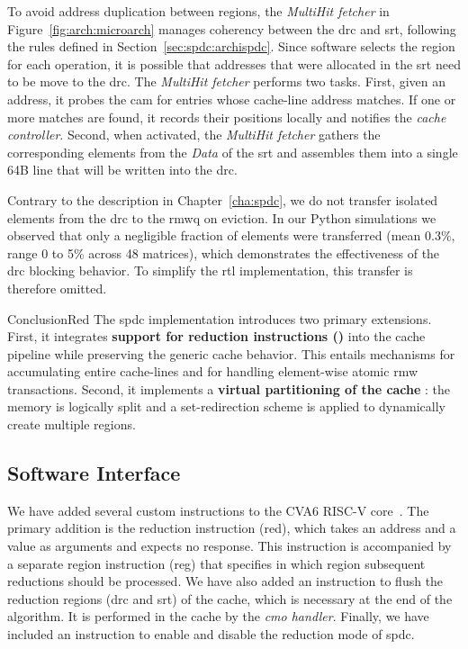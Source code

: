 To avoid address duplication between regions, the \textit{MultiHit fetcher} in Figure~\ref{fig:arch:microarch} manages coherency between the \acrshort{drc} and \acrshort{srt}, following the rules defined in Section~\ref{sec:spdc:archispdc}.
Since software selects the region for each operation, it is possible that addresses that were allocated in the \acrshort{srt} need to be move to the \acrshort{drc}.
The \textit{MultiHit fetcher} performs two tasks.
First, given an address, it probes the \acrshort{cam} for entries whose cache-line address matches.
If one or more matches are found, it records their positions locally and notifies the \textit{cache controller}.
Second, when activated, the \textit{MultiHit fetcher} gathers the corresponding elements from the \textit{Data}  of the \acrshort{srt} and assembles them into a single 64B line that will be written into the \acrshort{drc}.

Contrary to the description in Chapter~\ref{cha:spdc}, we do not transfer isolated elements from the \acrshort{drc} to the \acrshort{rmwq} on \gls{eviction}.
In our Python simulations we observed that only a negligible fraction of elements were transferred (mean 0.3\%, range 0 to 5\% across 48 matrices), which demonstrates the effectiveness of the \acrshort{drc} blocking behavior.
To simplify the \acrshort{rtl} implementation, this transfer is therefore omitted.

\begin{highlight}{Conclusion}{Red}
    The \acrlong{spdc} implementation introduces two primary extensions.
    First, it integrates \textbf{support for \gls{reduction} instructions ()} into the cache \gls{pipeline} while preserving the generic cache behavior.
    This entails mechanisms for accumulating entire cache-lines and for handling element-wise atomic \acrshort{rmw} transactions.
    Second, it implements a \textbf{virtual partitioning of the cache }: the memory is logically split and a \gls{set}-redirection scheme is applied to dynamically create multiple regions.
\end{highlight}

\subsection{Software Interface}
\label{sec:arch:sw_interface}

We have added several custom instructions to the CVA6 RISC-V core~\cite{Waterman2016_RISCV_ISA}.
The primary addition is the \gls{reduction} instruction (\acrshort{red}), which takes an address and a value as arguments and expects no response.
This instruction is accompanied by a separate region instruction (\acrshort{reg}) that specifies in which region subsequent \glspl{reduction} should be processed.
We have also added an instruction to flush the \gls{reduction} regions (\acrshort{drc} and \acrshort{srt}) of the cache, which is necessary at the end of the algorithm.
It is performed in the cache by the \textit{\acrshort{cmo} handler}.
Finally, we have included an instruction to enable and disable the \gls{reduction} mode of \acrlong{spdc}.

